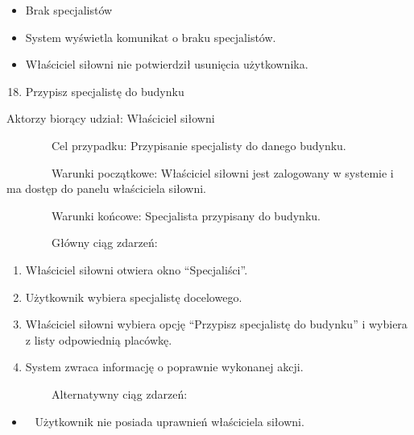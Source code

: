 \documentclass[
]{article}
\providecommand{\tightlist}{%
  \setlength{\itemsep}{0pt}\setlength{\parskip}{0pt}}
\begin{document}
\begin{itemize}
\tightlist
\item
  {Brak specjalistów}
\end{itemize}

\begin{itemize}
\tightlist
\item
  {System wyświetla komunikat o braku specjalistów.}
\end{itemize}

\begin{itemize}
\tightlist
\item
  {Właściciel siłowni nie potwierdził usunięcia użytkownika. }
\end{itemize}

{}

{}

\begin{enumerate}
\setcounter{enumi}{17}
\tightlist
\item
  {Przypisz specjalistę do budynku}
\end{enumerate}

{Aktorzy biorący udział: Właściciel siłowni}

{~~~~~~~~Cel przypadku: Przypisanie specjalisty do danego budynku.}

{~~~~~~~~Warunki początkowe: Właściciel siłowni jest zalogowany w
systemie i ma dostęp do panelu właściciela siłowni.}

{~~~~~~~~Warunki końcowe: Specjalista przypisany do budynku.}

{~~~~~~~~Główny ciąg zdarzeń:}

\begin{enumerate}
\tightlist
\item
  {Właściciel siłowni otwiera okno ``Specjaliści''.}
\item
  {Użytkownik wybiera specjalistę docelowego.}
\item
  {Właściciel siłowni wybiera opcję ``Przypisz specjalistę do budynku''
  i wybiera z listy odpowiednią placówkę.}
\item
  {System zwraca informację o poprawnie wykonanej akcji.}
\end{enumerate}

{~~~~~~~~Alternatywny ciąg zdarzeń:}

\begin{itemize}
\tightlist
\item
  {~ Użytkownik nie posiada uprawnień właściciela siłowni.}
\end{itemize}
\end{document}
